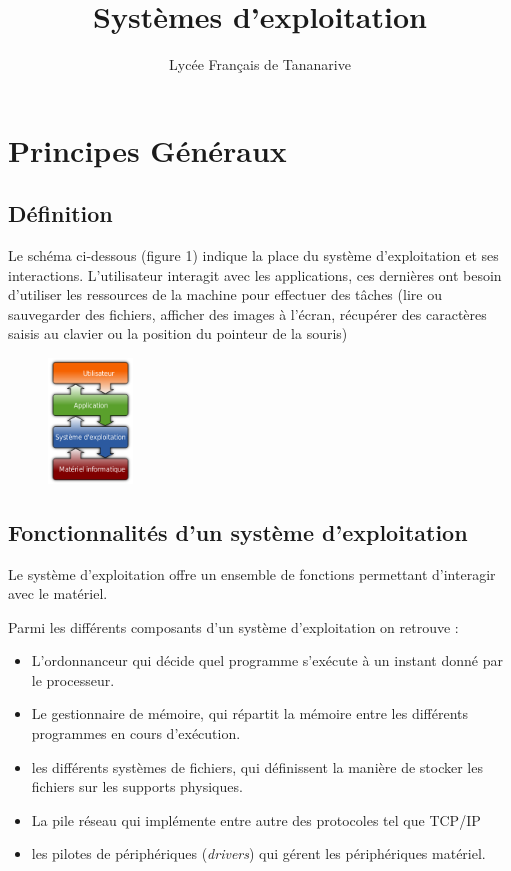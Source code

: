 \documentclass[a4paper,12pt]{exam}
\title{Systèmes d'exploitation}
\author{Lycée Français de Tananarive}
\date{}
\begin{document}
\maketitle
\thispagestyle{headandfoot}

\section{Principes Généraux}
\subsection{Définition}

\noindent{}

\bigskip
\setlength{\parindent}{8ex}Le schéma ci-dessous (figure 1) indique la place du système d'exploitation et ses interactions. L'utilisateur interagit avec les applications, ces dernières ont besoin d'utiliser les ressources de la machine pour effectuer des tâches (lire ou sauvegarder des fichiers, afficher des images à l'écran, récupérer des caractères saisis au clavier ou la position du pointeur de la souris)
\begin{figure}
	\centering
	\includegraphics[width=0.2\textwidth]{os.png}
	\caption{}
\end{figure}
\subsection{Fonctionnalités d'un système d'exploitation}
Le système d'exploitation offre un ensemble de fonctions permettant d'interagir avec le matériel.
\bigskip

Parmi les différents composants d'un système d'exploitation on retrouve :
\begin{itemize}
	\item L'ordonnanceur qui décide quel programme s'exécute à un instant donné par le processeur.
	\item Le gestionnaire de mémoire, qui répartit la mémoire entre les différents programmes en cours d'exécution.
	\item les différents systèmes de fichiers, qui définissent la manière de stocker les fichiers sur les supports physiques.
	\item La pile réseau qui implémente entre autre des protocoles tel que TCP/IP
	\item les pilotes de périphériques (\textit{drivers}) qui gérent les périphériques matériel.
\end{itemize}
\vfill
\end{document}

